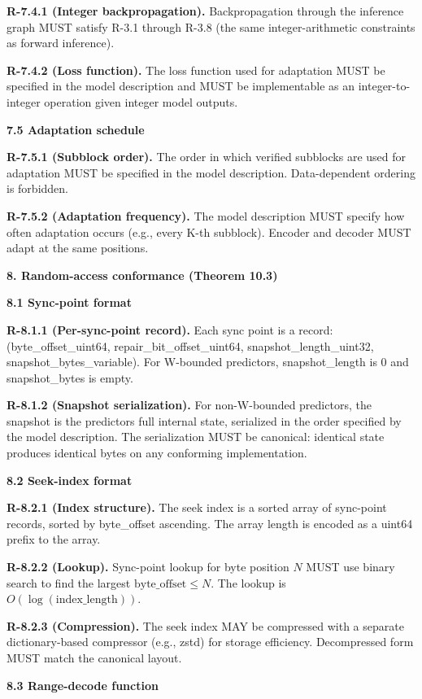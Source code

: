 \documentclass[
]{article}
\begin{document}
\textbf{R-7.4.1 (Integer backpropagation).} Backpropagation through the
inference graph MUST satisfy R-3.1 through R-3.8 (the same
integer-arithmetic constraints as forward inference).

\textbf{R-7.4.2 (Loss function).} The loss function used for adaptation
MUST be specified in the model description and MUST be implementable as
an integer-to-integer operation given integer model outputs.

\textbf{7.5 Adaptation schedule}

\textbf{R-7.5.1 (Subblock order).} The order in which verified subblocks
are used for adaptation MUST be specified in the model description.
Data-dependent ordering is forbidden.

\textbf{R-7.5.2 (Adaptation frequency).} The model description MUST
specify how often adaptation occurs (e.g., every K-th subblock). Encoder
and decoder MUST adapt at the same positions.

\textbf{8. Random-access conformance (Theorem 10.3)}

\textbf{8.1 Sync-point format}

\textbf{R-8.1.1 (Per-sync-point record).} Each sync point is a record:
(byte\_offset\_uint64, repair\_bit\_offset\_uint64,
snapshot\_length\_uint32, snapshot\_bytes\_variable). For W-bounded
predictors, snapshot\_length is 0 and snapshot\_bytes is empty.

\textbf{R-8.1.2 (Snapshot serialization).} For non-W-bounded predictors,
the snapshot is the predictor\textquotesingle s full internal state,
serialized in the order specified by the model description. The
serialization MUST be canonical: identical state produces identical
bytes on any conforming implementation.

\textbf{8.2 Seek-index format}

\textbf{R-8.2.1 (Index structure).} The seek index is a sorted array of
sync-point records, sorted by byte\_offset ascending. The array length
is encoded as a uint64 prefix to the array.

\textbf{R-8.2.2 (Lookup).} Sync-point lookup for byte position $N$
MUST use binary search to find the largest
$\mathrm{byte\_offset} \leq N$. The lookup is
$O(\log(\mathrm{index\_length}))$.

\textbf{R-8.2.3 (Compression).} The seek index MAY be compressed with a
separate dictionary-based compressor (e.g., zstd) for storage
efficiency. Decompressed form MUST match the canonical layout.

\textbf{8.3 Range-decode function}
\end{document}
